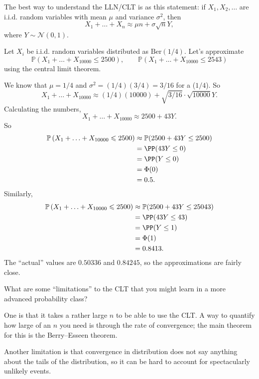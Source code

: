 \documentclass{ximera}
\begin{document}
The best way to understand the LLN/CLT is as this statement: if $X_1,X_2,\ldots$ are i.i.d. random variables with mean $\mu$ and variance $\sigma^2$, then
$$
X_1 + \ldots + X_n \approx \mu n + \sigma \sqrt{n}Y,
$$
where $Y \sim \mathcal{N}(0,1)$.
\begin{example}
Let $X_i$ be i.i.d. random variables distributed as $\text{Ber}(1/4)$. Let's approximate
$$
\mathbb{P}\left(X_{1}+\ldots+X_{10000} \leqslant 2500\right), \quad \quad \mathbb{P}\left(X_{1}+\ldots+X_{10000} \leqslant 2543\right)
$$
using the central limit theorem.

We know that $\mu=1/4$ and $\sigma^2=(1/4)(3/4)=3/16$ for a ($1/4$). So
$$
X_1 + \ldots + X_{10000} \approx (1/4)(10000) + \sqrt{3/16} \cdot \sqrt{10000} Y.
$$
Calculating the numbers,
$$
X_1 + \ldots + X_{10000} \approx 2500 + 43Y.
$$
So 
\begin{align*}
\mathbb{P}\left(X_{1}+\ldots+X_{10000} \leqslant 2500\right) &\approx \mathbb{P}(2500 + 43Y \leq 2500)\\
&= \PP(43Y \leq 0)\\
&= \PP( Y \leq 0)\\
&= \Phi(0) \\
&= 0.5.
\end{align*}
Similarly, 
\begin{align*}
\mathbb{P}\left(X_{1}+\ldots+X_{10000} \leqslant 2500\right) &\approx \mathbb{P}(2500 + 43Y \leq 25043)\\
&= \PP(43Y \leq 43)\\
&= \PP( Y \leq 1)\\
&= \Phi(1) \\
&= 0.8413.
\end{align*}
The ``actual'' values are $0.50336$ and $0.84245$, so the approximations are fairly close. 
\end{example}

What are some ``limitations'' to the CLT that you might learn in a more advanced probability class?

One is that it takes a rather large $n$ to be able to use the CLT. A way to quantify how large of an $n$ you need is through the rate of convergence; the main theorem for this is the Berry--Esseen theorem. 

Another limitation is that convergence in distribution does not say anything about the tails of the distribution, so it can be hard to account for spectacularly unlikely events.
\end{document}
